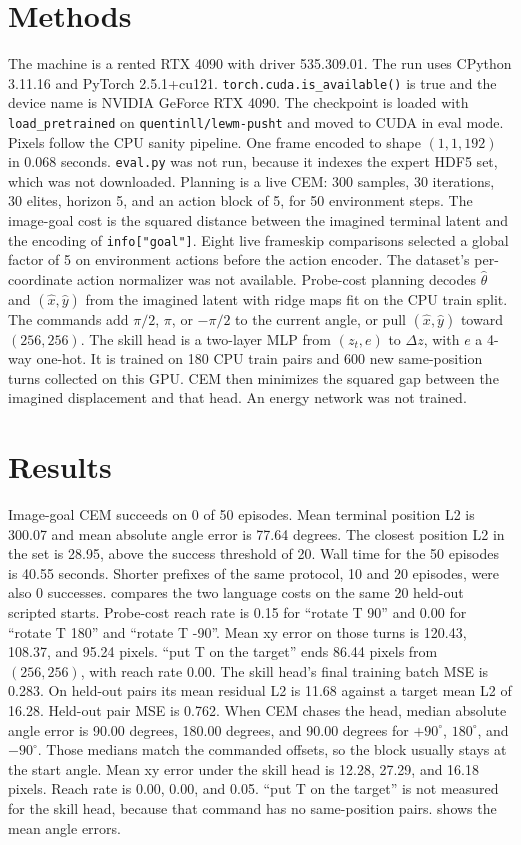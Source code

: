 \documentclass[11pt,a4paper]{article}
\begin{document}
\section{Methods}
\label{sec:methods}
The machine is a rented RTX 4090 with driver 535.309.01.
The run uses CPython 3.11.16 and PyTorch 2.5.1+cu121.
\texttt{torch.cuda.is\_available()} is true and the device name is NVIDIA GeForce RTX 4090.
The checkpoint is loaded with \texttt{load\_pretrained} on \texttt{quentinll/lewm-pusht} and moved to CUDA in eval mode.
Pixels follow the CPU sanity pipeline.
One frame encoded to shape $(1,1,192)$ in 0.068 seconds.
\texttt{eval.py} was not run, because it indexes the expert HDF5 set, which was not downloaded.
Planning is a live CEM: 300 samples, 30 iterations, 30 elites, horizon 5, and an action block of 5, for 50 environment steps.
The image-goal cost is the squared distance between the imagined terminal latent and the encoding of \texttt{info["goal"]}.
Eight live frameskip comparisons selected a global factor of 5 on environment actions before the action encoder.
The dataset's per-coordinate action normalizer was not available.
Probe-cost planning decodes $\hat\theta$ and $(\hat x,\hat y)$ from the imagined latent with ridge maps fit on the CPU train split.
The commands add $\pi/2$, $\pi$, or $-\pi/2$ to the current angle, or pull $(\hat x,\hat y)$ toward $(256,256)$.
The skill head is a two-layer MLP from $(z_t, e)$ to $\Delta z$, with $e$ a 4-way one-hot.
It is trained on 180 CPU train pairs and 600 new same-position turns collected on this GPU.
CEM then minimizes the squared gap between the imagined displacement and that head.
An energy network was not trained.

\section{Results}
\label{sec:results}
Image-goal CEM succeeds on 0 of 50 episodes.
Mean terminal position L2 is 300.07 and mean absolute angle error is 77.64 degrees.
The closest position L2 in the set is 28.95, above the success threshold of 20.
Wall time for the 50 episodes is 40.55 seconds.
Shorter prefixes of the same protocol, 10 and 20 episodes, were also 0 successes.
 compares the two language costs on the same 20 held-out scripted starts.
Probe-cost reach rate is 0.15 for ``rotate T 90'' and 0.00 for ``rotate T 180'' and ``rotate T -90''.
Mean xy error on those turns is 120.43, 108.37, and 95.24 pixels.
``put T on the target'' ends 86.44 pixels from $(256,256)$, with reach rate 0.00.
The skill head's final training batch MSE is 0.283.
On held-out pairs its mean residual L2 is 11.68 against a target mean L2 of 16.28.
Held-out pair MSE is 0.762.
When CEM chases the head, median absolute angle error is 90.00 degrees, 180.00 degrees, and 90.00 degrees for $+90^{\circ}$, $180^{\circ}$, and $-90^{\circ}$.
Those medians match the commanded offsets, so the block usually stays at the start angle.
Mean xy error under the skill head is 12.28, 27.29, and 16.18 pixels.
Reach rate is 0.00, 0.00, and 0.05.
``put T on the target'' is not measured for the skill head, because that command has no same-position pairs.
 shows the mean angle errors.
\end{document}
